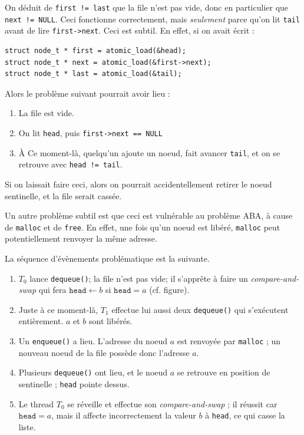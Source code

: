 On déduit de \texttt{first != last} que la file n'est pas vide, donc en
particulier que \texttt{next != NULL}. Ceci fonctionne correctement, mais
\emph{seulement} parce qu'on lit \texttt{tail} avant de lire
\texttt{first->next}. Ceci est subtil. En effet, si on avait écrit :
\begin{verbatim}
struct node_t * first = atomic_load(&head); 
struct node_t * next = atomic_load(&first->next); 
struct node_t * last = atomic_load(&tail);
\end{verbatim}
Alors le problème suivant pourrait avoir lieu :
\begin{enumerate}
\item La file est vide.
\item On lit \texttt{head}, puis \texttt{first->next == NULL}
\item À Ce moment-là, quelqu'un ajoute un noeud, fait avancer \texttt{tail}, et on se retrouve avec \texttt{head != tail}.
\end{enumerate}
Si on laissait faire ceci, alors on pourrait accidentellement retirer le noeud sentinelle, et la file serait cassée.

Un autre problème subtil est que ceci est vulnérable au problème ABA, à cause de
\texttt{malloc} et de \texttt{free}. En effet, une fois qu'un noeud est libéré,
\texttt{malloc} peut potentiellement renvoyer la même adresse.


La séquence d'évènements problématique est la suivante.
\begin{enumerate}
\item $T_0$ lance \texttt{dequeue()}; la file n'est pas vide; il s'apprête à faire un \emph{compare-and-swap} qui fera $\texttt{head} \gets b$ si $\texttt{head} = a$ (cf. figure).
\item Juste à ce moment-là, $T_1$ effectue lui aussi deux \texttt{dequeue()} qui s'exécutent entièrement. $a$ et $b$ sont libérés.
\item Un \texttt{enqueue()} a lieu. L'adresse du noeud $a$ est renvoyée par \texttt{malloc} ; un nouveau noeud de la file possède donc l'adresse $a$.
\item Plusieurs \texttt{dequeue()} ont lieu, et le noeud $a$ se retrouve en position de sentinelle ; \texttt{head} pointe dessus.
\item Le thread $T_0$ se réveille et effectue son \emph{compare-and-swap} ; il réussit car $\texttt{head} = a$, mais il affecte incorrectement la valeur $b$ à \texttt{head}, ce qui casse la liste.
\end{enumerate}

